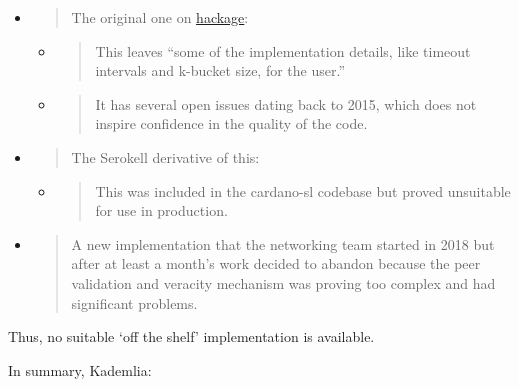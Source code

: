 \documentclass[11pt,a4paper]{article}
\begin{document}
\begin{itemize}
\item
  \begin{quote}
  The original one on
  \href{https://hackage.haskell.org/package/kademlia-1.1.0.0}{{hackage}}:
  \end{quote}

  \begin{itemize}
  \item
    \begin{quote}
    This leaves ``some of the implementation details, like timeout
    intervals and k-bucket size, for the user.''
    \end{quote}
  \item
    \begin{quote}
    It has several open issues dating back to 2015, which does not
    inspire confidence in the quality of the code.
    \end{quote}
  \end{itemize}
\item
  \begin{quote}
  The Serokell derivative of this:
  \end{quote}

  \begin{itemize}
  \item
    \begin{quote}
    This was included in the cardano-sl codebase but proved unsuitable
    for use in production.
    \end{quote}
  \end{itemize}
\item
  \begin{quote}
  A new implementation that the networking team started in 2018 but
  after at least a month's work decided to abandon because the peer
  validation and veracity mechanism was proving too complex and had
  significant problems.
  \end{quote}
\end{itemize}

Thus, no suitable `off the shelf' implementation is available.

In summary, Kademlia:
\end{document}
